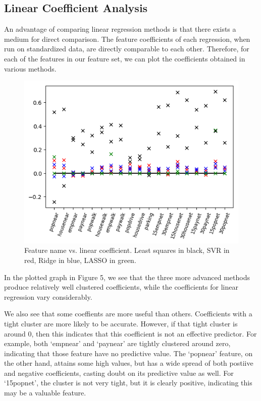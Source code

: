 \documentclass{article}
\begin{document}
\subsection{Linear Coefficient Analysis}

An advantage of comparing linear regression methods is that there exists a medium for direct comparison. The feature coefficients of each regression, when run on standardized data, are directly comparable to each other. Therefore, for each of the features in our feature set, we can plot the coefficients obtained in various methods.

\begin{figure}[H]\label{fig:f5}
\begin{center}\includegraphics[scale=1]{coef_by_type}\end{center}
\caption{Feature name vs. linear coefficient. Least squares in black, SVR in red, Ridge in blue, LASSO in green.}
\end{figure}

In the plotted graph in Figure 5, we see that the three more advanced methods produce relatively well clustered coefficients, while the coefficients for linear regression vary considerably.

\pagebreak
We also see that some coeffients are more useful than others. Coefficients with a tight cluster are more likely to be accurate. However, if that tight cluster is around 0, then this indicates that this coefficient is not an effective predictor. For example, both `empnear' and `paynear' are tightly clustered around zero, indicating that those feature have no predictive value. The `popnear' feature, on the other hand, attains some high values, but has a wide spread of both postiive and negative coefficients, casting doubt on its predictive value as well. For `15popnet', the cluster is not very tight, but it is clearly positive, indicating this may be a valuable feature.
\end{document}
